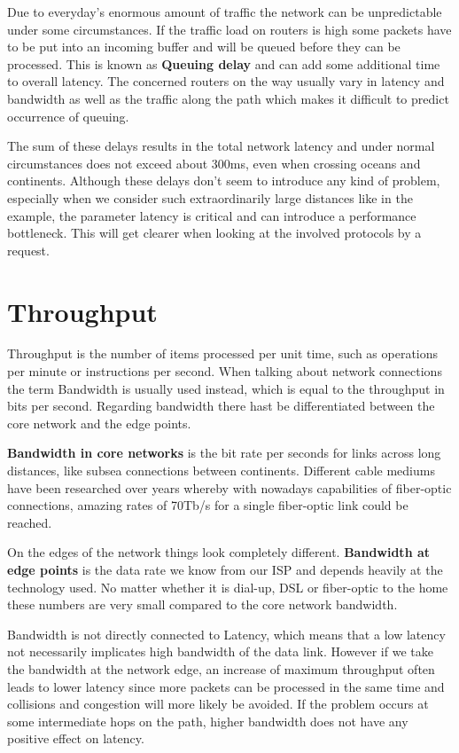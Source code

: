 Due to everyday's enormous amount of traffic the network can be unpredictable under some circumstances. If the traffic load on routers is high some packets have to be put into an incoming buffer and will be queued before they can be processed. This is known as \textbf{Queuing delay} and can add some additional time to overall latency. The concerned routers on the way usually vary in latency and bandwidth as well as the traffic along the path which makes it difficult to predict occurrence of queuing.   

The sum of these delays results in the total network latency and under normal circumstances does not exceed about 300ms, even when crossing oceans and continents. \cite{Grigorik_2013} Although these delays don't seem to introduce any kind of problem, especially when we consider such extraordinarily large distances like in the example, the parameter latency is critical and can introduce a performance bottleneck. This will get clearer when looking at the involved protocols by a request.

\section{Throughput}
Throughput is the number of items processed per unit time, such as operations per minute or instructions per second. When talking about network connections the term Bandwidth is usually used instead, which is equal to the throughput in bits per second. 
Regarding bandwidth there hast be differentiated between the core network and the edge points. 

\textbf{Bandwidth in core networks} is the bit rate per seconds for links across long distances, like subsea connections between continents. Different cable mediums have been researched over years whereby with nowadays capabilities of fiber-optic connections, amazing rates of 70Tb/s for a single fiber-optic link could be reached.   

On the edges of the network things look completely different. \textbf{Bandwidth at edge points} is the data rate we know from our ISP and depends heavily at the technology used. No matter whether it is dial-up, DSL or fiber-optic to the home these numbers are very small compared to the core network bandwidth.  \cite{Grigorik_2013}

Bandwidth is not directly connected to Latency, which means that a low latency not necessarily implicates high bandwidth of the data link. However if we take the bandwidth at the network edge, an increase of maximum throughput often leads to lower latency since more packets can be processed in the same time and collisions and congestion will more likely be avoided. If the problem occurs at some intermediate hops on the path, higher bandwidth does not have any positive effect on latency. \cite{Killelea_2002}


